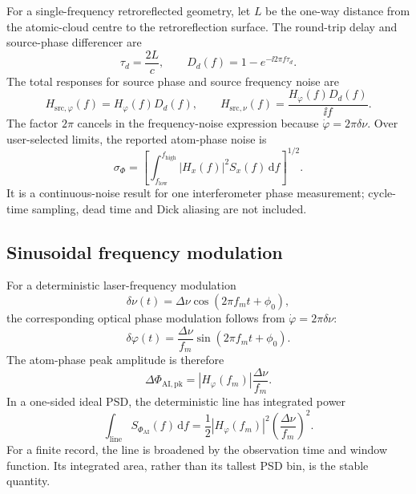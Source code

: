 \documentclass[11pt,a4paper]{article}
\newcommand{\Hphi}{H_{\varphi}}
\newcommand{\dd}{\,\mathrm{d}}
\begin{document}
For a single-frequency retroreflected geometry, let $L$ be the one-way distance from the atomic-cloud centre to the retroreflection surface. The round-trip delay and source-phase differencer are
\begin{equation}
 \tau_d=\frac{2L}{c},\qquad D_d(f)=1-e^{-\ii2\pi f\tau_d}.
\end{equation}
The total responses for source phase and source frequency noise are
\begin{equation}
 H_{\mathrm{src},\varphi}(f)=\Hphi(f)D_d(f),\qquad
 H_{\mathrm{src},\nu}(f)=\frac{\Hphi(f)D_d(f)}{\ii f}.
\end{equation}
The factor $2\pi$ cancels in the frequency-noise expression because
$\dot\varphi=2\pi\delta\nu$. Over user-selected limits, the reported atom-phase noise is
\begin{equation}
 \boxed{\sigma_\Phi=\left[\int_{f_{\mathrm{low}}}^{f_{\mathrm{high}}}
 |H_x(f)|^2S_x(f)\dd f\right]^{1/2}.}
\end{equation}
It is a continuous-noise result for one interferometer phase measurement; cycle-time sampling, dead time and Dick aliasing are not included.

\subsection{Sinusoidal frequency modulation}

For a deterministic laser-frequency modulation
\begin{equation}
\delta\nu(t)=\Delta\nu\cos(2\pi f_m t+\phi_0),
\end{equation}
the corresponding optical phase modulation follows from $\dot{\varphi}=2\pi\delta\nu$:
\begin{equation}
\delta\varphi(t)=\frac{\Delta\nu}{f_m}\sin(2\pi f_m t+\phi_0).
\end{equation}
The atom-phase peak amplitude is therefore
\begin{equation}
\Delta\Phi_{\mathrm{AI,pk}}=|\Hphi(f_m)|\frac{\Delta\nu}{f_m}.
\end{equation}
In a one-sided ideal PSD, the deterministic line has integrated power
\begin{equation}
\int_{\mathrm{line}}S_{\Phi_{\mathrm{AI}}}(f)\dd f
=\frac{1}{2}|\Hphi(f_m)|^2\left(\frac{\Delta\nu}{f_m}\right)^2.
\end{equation}
For a finite record, the line is broadened by the observation time and window function. Its integrated area, rather than its tallest PSD bin, is the stable quantity.
\end{document}
